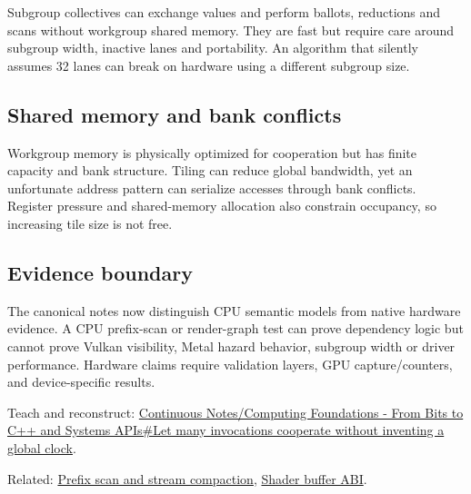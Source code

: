 Subgroup collectives can exchange values and perform ballots, reductions and scans without workgroup shared memory. They are fast but require care around subgroup width, inactive lanes and portability. An algorithm that silently assumes 32 lanes can break on hardware using a different subgroup size.

\subsection{Shared memory and bank conflicts}\label{appendix-f662b5b1773b-shared-memory-and-bank-conflicts}

Workgroup memory is physically optimized for cooperation but has finite capacity and bank structure. Tiling can reduce global bandwidth, yet an unfortunate address pattern can serialize accesses through bank conflicts. Register pressure and shared-memory allocation also constrain occupancy, so increasing tile size is not free.

\subsection{Evidence boundary}\label{appendix-f662b5b1773b-evidence-boundary}

The canonical notes now distinguish CPU semantic models from native hardware evidence. A CPU prefix-scan or render-graph test can prove dependency logic but cannot prove Vulkan visibility, Metal hazard behavior, subgroup width or driver performance. Hardware claims require validation layers, GPU capture/counters, and device-specific results.

Teach and reconstruct: \hyperref[01-foundations-i-ch008-let-many-invocations-cooperate-without-inventing-a-global-clock]{Continuous Notes/Computing Foundations - From Bits to C++ and Systems APIs\#Let many invocations cooperate without inventing a global clock}.

Related: \hyperref[appendix-f2ee4d086415]{Prefix scan and stream compaction}, \hyperref[appendix-749048795dbb]{Shader buffer ABI}.
